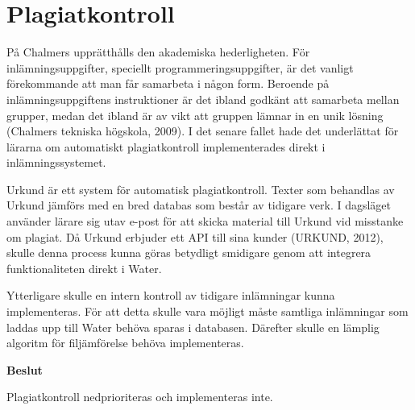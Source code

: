 \section{Plagiatkontroll}
På Chalmers upprätthålls den akademiska hederligheten. För inlämningsuppgifter, speciellt programmeringsuppgifter, är det vanligt förekommande att man får samarbeta i någon form. Beroende på inlämningsuppgiftens instruktioner är det ibland godkänt att samarbeta mellan grupper, medan det ibland är av vikt att gruppen lämnar in en unik lösning (Chalmers tekniska högskola, 2009). I det senare fallet hade det underlättat för lärarna om automatiskt plagiatkontroll implementerades direkt i inlämningssystemet.

Urkund är ett system för automatisk plagiatkontroll. Texter som behandlas av Urkund jämförs med en bred databas som består av tidigare verk. I dagsläget använder lärare sig utav e-post för att skicka material till Urkund vid misstanke om plagiat. Då Urkund erbjuder ett API till sina kunder (URKUND, 2012), skulle denna process kunna göras betydligt smidigare genom att integrera funktionaliteten direkt i Water.

Ytterligare skulle en intern kontroll av tidigare inlämningar kunna implementeras. För att detta skulle vara möjligt måste samtliga inlämningar som laddas upp till Water behöva sparas i databasen. Därefter skulle en lämplig algoritm för filjämförelse behöva implementeras.

\begin{flushright}
  
  \textbf{Beslut}
  
  Plagiatkontroll nedprioriteras och implementeras inte.
  
\end{flushright}
